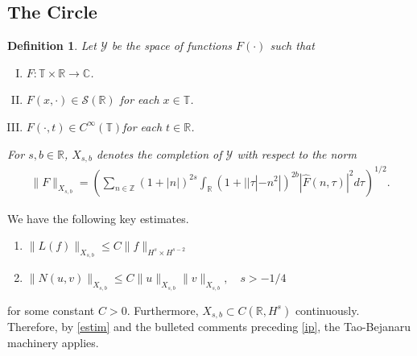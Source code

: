 \documentclass{amsart}
\newtheorem{definition}[theorem]{Definition}
\newcommand{\rr}{\mathbb{R}}
\newcommand{\zz}{\mathbb{Z}}
\newcommand{\cc}{\mathbb{C}}
\newcommand{\ci}{\mathbb{T}}
\newcommand{\wh}{\widehat}
\begin{document}
\subsection{The Circle} 
%
%
\begin{definition}
  Let $\mathcal{Y}$ be the space of functions $F(\cdot)$ such that
  \begin{enumerate}[(I)]
   \item{$F: \ci \times \rr \to \cc$}.
   \item{$F(x, \cdot) \in \mathcal{S}(\rr)$ for each $x \in \ci$}.
   \item{$F(\cdot, t) \in C^{\infty}(\ci)$for each $t \in \rr$}.
  \end{enumerate}
  For $s, b \in \rr$, $X_{s,b}$ denotes the completion of $\mathcal{Y}$ with
  respect to the norm
  \begin{equation}
  \begin{split}
    \|F\|_{X_{s,b}} = \left( \sum_{n \in \zz} (1 + |n|)^{2s} \int_{\rr}
    (1 + | | \tau | - n^{2} |)^{2b} |\wh{F}(n, \tau)|^{2} d \tau\right)^{1/2}.
  \end{split}
  \label{eqn:bous-norm}
  \end{equation}
\end{definition}
%
We have the following key estimates.
\begin{enumerate}
  \item{$\|L(f)\|_{X_{s,b}} \le C \| f \|_{H^s \times H^{s-2}}$}
  \item{$\| N(u, v) \|_{X_{s,b}} \le C  \| u \|_{X_{s,b}} \| v \|_{X_{s,b}}, \quad s > -1/4$} 
\end{enumerate}
for some constant $C > 0$.
%
Furthermore, $X_{s,b} \subset C(\rr, H^{s})$
continuously. Therefore, by \eqref{estim} and the bulleted comments preceding
\eqref{ip}, the Tao-Bejanaru machinery applies.
%
%
%
%
%
\end{document}
